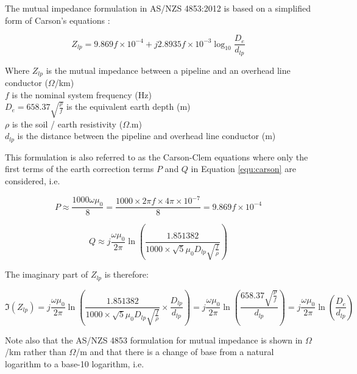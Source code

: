 \documentclass{article}
\begin{document}
The mutual impedance formulation in AS/NZS 4853:2012 is based on a simplified form of Carson's equations \cite{AS4853_2012}:

\begin{equation}
Z_{lp} = 9.869 f \times 10^{-4} + j 2.8935 f \times 10^{-3} \log_{10}{\frac{D_{e}}{d_{lp}}}
\end{equation}

Where $Z_{lp}$ is the mutual impedance between a pipeline and an overhead line conductor ($\Omega$/km) \\
\hphantom{Where} $f$ is the nominal system frequency (Hz) \\
\hphantom{Where} $D_{e} = 658.37 \sqrt{\frac{\rho}{f}}$ is the equivalent earth depth (m) \\
\hphantom{Where} $\rho$ is the soil / earth resistivity ($\Omega$.m) \\
\hphantom{Where} $d_{lp}$ is the distance between the pipeline and overhead line conductor (m)

This formulation is also referred to as the Carson-Clem equations \cite{ITU_1989} where only the first terms of the earth correction terms $P$ and $Q$ in Equation \ref{equ:carson} are considered, i.e.

\begin{equation}
P \approx \frac{1000 \omega \mu_0}{8} = \frac{1000 \times 2 \pi f \times 4 \pi \times 10^{-7}}{8} = 9.869f \times 10^{-4}
\end{equation}

\begin{equation}
Q \approx j \frac{\omega \mu_0}{2 \pi} \ln{\left( \frac{1.851382}{1000 \times \sqrt{5} \mu_0 D_{lp} \sqrt{\frac{f}{\rho}}} \right)}
\end{equation}

The imaginary part of $Z_{lp}$ is therefore:

\begin{equation}
\Im (Z_{lp}) = j \frac{\omega \mu_0}{2 \pi} \ln{\left( \frac{1.851382}{1000 \times \sqrt{5} \mu_0 D_{lp} \sqrt{\frac{f}{\rho}}} \times \frac{D_{lp}}{d_{lp}} \right)} =  j \frac{\omega \mu_0}{2 \pi} \ln{\left( \frac{658.37 \sqrt{\frac{\rho}{f}}}{d_{lp}} \right)} =  j \frac{\omega \mu_0}{2 \pi} \ln{\left( \frac{D_e}{d_{lp}} \right)}
\end{equation}

Note also that the AS/NZS 4853 formulation for mutual impedance is shown in $\Omega$/km rather than $\Omega$/m and that there is a change of base from a natural logarithm to a base-10 logarithm, i.e. 
\end{document}
